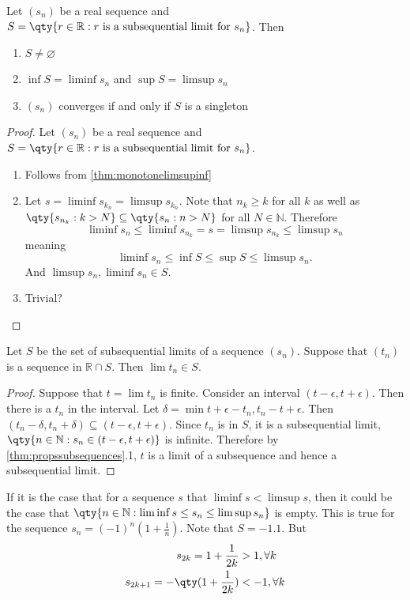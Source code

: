 \documentclass[../notes.tex]{subfiles}
\begin{document}
\begin{theorem}
    \label{thm:setofsublimits}
    Let $(s_n)$ be a real sequence and $S = \qty{r \in \mathbb{R} : r \text{ is a subsequential limit for } s_n}$. Then
    \begin{enumerate}
        \item $S \neq \varnothing$
        \item $\inf S = \liminf s_n$ and $\sup S = \limsup s_n$
        \item $(s_n)$ converges if and only if $S$ is a singleton
    \end{enumerate}
\end{theorem}
\begin{proof}
    Let $(s_n)$ be a real sequence and $S = \qty{r \in \mathbb{R} : r \text{ is a subsequential limit for } s_n}$.
    \begin{enumerate}
        \item Follows from \ref{thm:monotonelimsupinf}
        \item Let $s = \liminf s_{k_n} = \limsup s_{k_n}$. Note that $n_k \geq k$ for all $k$ as well as $\qty{s_{n_k} : k > N} \subseteq \qty{s_n : n > N}$ for all $N \in \mathbb{N}$. Therefore 
            \[
                \liminf s_n \leq \liminf s_{n_k} = s = \limsup s_{n_k} \leq \limsup s_n
            \]
            meaning
            \[
                \liminf s_n \leq \inf S \leq \sup S \leq \limsup s_n.
            \]
            And $\limsup s_n, \liminf s_n \in S$.
        \item Trivial?
    \end{enumerate}
\end{proof}

\begin{theorem}
    Let $S$ be the set of subsequential limits of a sequence $(s_n)$. Suppose that $(t_n)$ is a sequence in $\mathbb{R} \cap S$. Then $\lim t_n \in S$.
\end{theorem}
\begin{proof}
    Suppose that $t = \lim t_n$ is finite. Consider an interval $(t - \epsilon, t + \epsilon)$. Then there is a $t_n$ in the interval. Let $\delta = \min{t + \epsilon - t_n, t_n - t + \epsilon}$. Then $(t_n - \delta, t_n + \delta) \subseteq (t - \epsilon, t + \epsilon)$. Since $t_n$ is in $S$, it is a subsequential limit, $\qty{n \in \mathbb{N} : s_n \in (t - \epsilon, t + \epsilon) }$ is infinite. Therefore by \ref{thm:propssubsequences}.1, $t$ is a limit of a subsequence and hence a subsequential limit.
\end{proof}

\begin{example}
    If it is the case that for a sequence $s$ that $\liminf s < \limsup s$, then it could be the case that $\qty{n\in \mathbb{N} : \liminf s \leq s_n \leq \limsup s_n}$ is empty. This is true for the sequence $s_n = (-1)^n (1+\frac{1}{n})$. Note that $S = \qty{-1, 1}$. But
    \begin{align*}
        s_{2k} = 1+ \frac{1}{2k} &> 1, \forall k \\
        s_{2k + 1} = -\qty(1+ \frac{1}{2k}) &< -1, \forall k \\
    \end{align*}
\end{example}
\end{document}

